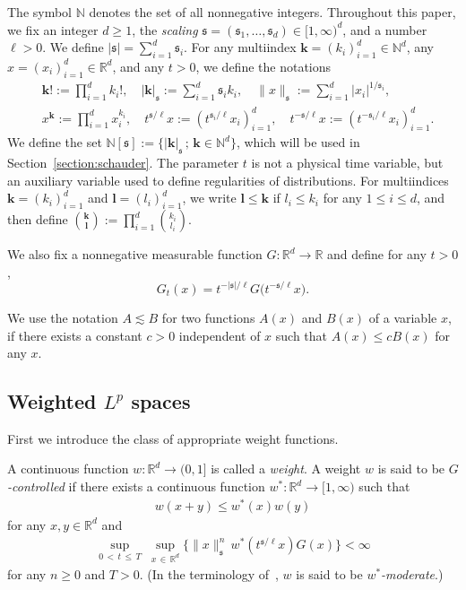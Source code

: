 \documentclass[AHL,Unicode,longabstracts,published]{cedram}
\newcommand{\bbR}{\mathbb{R}}
\newcommand{\bbN}{\mathbb{N}}
\newcommand{\mfs}{\mathfrak{s}}
\newcommand{\wco}{w^*}
\newcommand{\bfk}{\mathbf{k}}
\newcommand{\bfl}{\mathbf{l}}
\begin{document}
The symbol $\bbN$ denotes the set of all nonnegative integers. Throughout this paper, we fix an integer $d\ge1$, the \emph{scaling} $\mfs=(\mfs_1,\dots,\mfs_d)\in[1,\infty)^d$, and a number $\ell>0$. We define $|\mfs|=\sum_{i=1}^d\mfs_i$. For any multiindex ${\bfk}=(k_i)_{i=1}^d\in\bbN^d$, any $x=(x_i)_{i=1}^d\in\bbR^d$, and any $t>0$, we define the notations
\begin{align*}
&{\bfk}!:=\prod_{i=1}^dk_i!,\quad |{\bfk}|_{\mfs}:=\sum_{i=1}^d\mfs_ik_i,\quad
\|x\|_\mfs:=\sum_{i=1}^d|x_i|^{1/\mfs_i},\\
&x^{\bfk}:=\prod_{i=1}^dx_i^{k_i},\quad t^{\mfs/\ell}x:=\left(t^{\mfs_i/\ell}x_i\right)_{i=1}^d,\quad t^{-\mfs/\ell}x:=\left(t^{-\mfs_i/\ell}x_i\right)_{i=1}^d.
\end{align*}
We define the set $\bbN[\mfs]:=\{|{\bfk}|_\mfs\,;\,{\bfk}\in\bbN^d\}$, which will be used in Section~\ref{section:schauder}. The parameter $t$ is not a physical time variable, but an auxiliary variable used to define regularities of distributions. For multiindices ${\bfk}=(k_i)_{i=1}^d$ and ${\bfl}=(l_i)_{i=1}^d$, we write ${\bfl}\le{\bfk}$ if $l_i\le k_i$ for any $1\le i\le d$, and then define $\binom{{\bfk}}{{\bfl}}:=\prod_{i=1}^d\binom{k_i}{l_i}$.

We also fix a nonnegative measurable function $G:\bbR^d\to\bbR$ and define for any $t>0$,
\[
G_t(x)=t^{-|\mfs|/\ell}G\big(t^{-\mfs/\ell}x\big).
\]

We use the notation $A\lesssim B$ for two functions $A(x)$ and $B(x)$ of a variable $x$, if there exists a constant $c>0$ independent of $x$ such that $A(x)\le cB(x)$ for any $x$.

\subsection{Weighted \texorpdfstring{$L^p$}{Lp} spaces}

First we introduce the class of appropriate weight functions.

\begin{defi}\label{defweight}
A continuous function $w:\bbR^d\to(0,1]$ is called a \emph{weight}. A weight $w$ is said to be \emph{$G$-controlled} if there exists a continuous function $\wco:\bbR^d\to[1,\infty)$ such that
\begin{align}\label{weightmoderate}
w(x+y)\le \wco(x)w(y)
\end{align}
for any $x,y\in\bbR^d$ and
\begin{align}\label{weightintegrable}
\sup_{0\,<\,t\,\le\,T}\;\sup_{x\,\in\,\bbR^d}\Big\{\|x\|_\mfs^n\,\wco\left(t^{\mfs/\ell}x\right)G(x)\Big\}<\infty
\end{align}
for any $n\ge0$ and $T>0$. (In the terminology of~\cite[Definition~2.3]{MW17}, $w$ is said to be \emph{$\wco$-moderate}.)
\end{defi}
\end{document}

